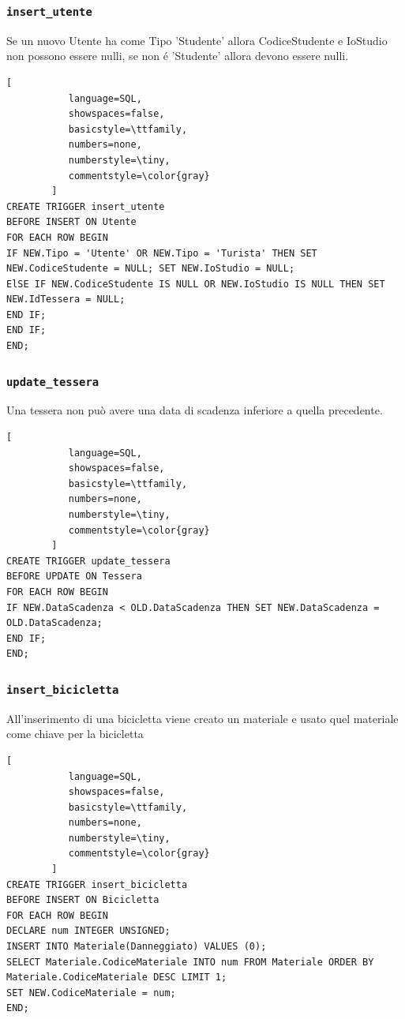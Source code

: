 \documentclass[a4paper,twoside]{article}
\begin{document}
\subsubsection{\texttt{insert\_utente}}
Se un nuovo Utente ha come Tipo 'Studente' allora CodiceStudente e IoStudio non possono essere nulli, se non é 'Studente' allora devono essere nulli.
\begin{lstlisting}[
           language=SQL,
           showspaces=false,
           basicstyle=\ttfamily,
           numbers=none,
           numberstyle=\tiny,
           commentstyle=\color{gray}
        ]
CREATE TRIGGER insert_utente
BEFORE INSERT ON Utente
FOR EACH ROW BEGIN
IF NEW.Tipo = 'Utente' OR NEW.Tipo = 'Turista' THEN SET NEW.CodiceStudente = NULL; SET NEW.IoStudio = NULL;
ElSE IF NEW.CodiceStudente IS NULL OR NEW.IoStudio IS NULL THEN SET NEW.IdTessera = NULL;
END IF;
END IF;
END;
\end{lstlisting}
\subsubsection{\texttt{update\_tessera}}
Una tessera non può avere una data di scadenza inferiore a quella precedente.
\begin{lstlisting}[
           language=SQL,
           showspaces=false,
           basicstyle=\ttfamily,
           numbers=none,
           numberstyle=\tiny,
           commentstyle=\color{gray}
        ]
CREATE TRIGGER update_tessera
BEFORE UPDATE ON Tessera
FOR EACH ROW BEGIN
IF NEW.DataScadenza < OLD.DataScadenza THEN SET NEW.DataScadenza = OLD.DataScadenza;
END IF;
END;
\end{lstlisting}
\subsubsection{\texttt{insert\_bicicletta}}
All'inserimento di una bicicletta viene creato un materiale e usato quel materiale come chiave per la bicicletta
\begin{lstlisting}[
           language=SQL,
           showspaces=false,
           basicstyle=\ttfamily,
           numbers=none,
           numberstyle=\tiny,
           commentstyle=\color{gray}
        ]
CREATE TRIGGER insert_bicicletta
BEFORE INSERT ON Bicicletta
FOR EACH ROW BEGIN
DECLARE num INTEGER UNSIGNED;
INSERT INTO Materiale(Danneggiato) VALUES (0);
SELECT Materiale.CodiceMateriale INTO num FROM Materiale ORDER BY Materiale.CodiceMateriale DESC LIMIT 1;
SET NEW.CodiceMateriale = num;
END;
\end{lstlisting}
\end{document}
